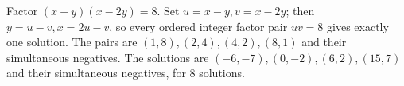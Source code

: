 Factor $(x-y)(x-2y)=8$. Set $u=x-y,v=x-2y$; then $y=u-v,x=2u-v$, so every ordered integer factor pair $uv=8$ gives exactly one solution. The pairs are $(1,8),(2,4),(4,2),(8,1)$ and their simultaneous negatives. The solutions are $(-6,-7),(0,-2),(6,2),(15,7)$ and their simultaneous negatives, for $\boxed8$ solutions.
